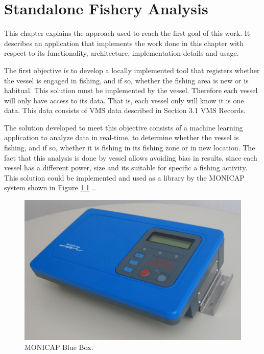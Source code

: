 % 
% 
%
\chapter{Standalone Fishery Analysis}
\label{cha:standalone_fishery_analysis}
This chapter explains the approach used to reach the first goal of this work. It describes an application that implements the work done in this chapter with respect to its functionality, architecture, implementation details and usage. 


The first objective is to develop a locally implemented tool that registers whether the vessel is engaged in fishing, and if so, whether the fishing area is new or is habitual. This solution must be implemented by the vessel. Therefore each vessel will only have access to its data. That is, each vessel only will know it is one data. This data consists of VMS data described in Section 3.1 VMS Records.

The solution developed to meet this objective consists of a machine learning application to analyze data in real-time, to determine whether the vessel is fishing, and if so, whether it is fishing in its fishing zone or in new location.
The fact that this analysis is done by vessel allows avoiding bias in results, since each vessel has a different power, size and its suitable for specific a fishing activity.\\
This solution could be implemented and used as a library by the MONICAP system shown in Figure \ref{fig:monicap} .\cite{WEBSITE:MonicapXsealence}.

\begin{figure}[H]
\centering
\includegraphics[width=0.8\linewidth]{Chapters/img/equipamento_monicap.png}
\caption{MONICAP Blue Box.}
\label{fig:monicap}
\end{figure}

